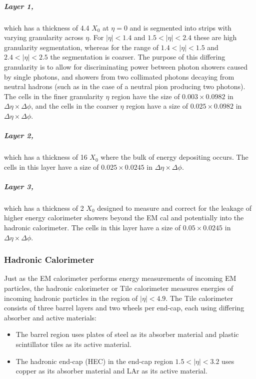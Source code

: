 \documentclass[12pt,a4paper,epsf,portrait,times,epsfig]{report}
\begin{document}
		\subparagraph{Layer 1,} which has a thickness of 4.4 $X_{0}$ at $\eta = 0$ and is segmented into strips with varying granularity across $\eta$. For $|\eta| < 1.4$ and $1.5 < |\eta| < 2.4$ these are high granularity segmentation, whereas for the range of $1.4 < |\eta| < 1.5$ and $2.4 < |\eta| < 2.5$ the segmentation is coarser. The purpose of this differing granularity is to allow for discriminating power between photon showers caused by single photons, and showers from two collimated photons decaying from neutral hadrons (such as in the case of a neutral pion producing two photons). The cells in the finer granularity $\eta$ region have the size of $0.003 \times 0.0982$ in $\Delta\eta \times \Delta\phi$, and the cells in the coarser $\eta$ region have a size of $0.025 \times 0.0982$ in $\Delta\eta \times \Delta\phi$. 
		
		\subparagraph{Layer 2,} which has a thickness of 16 $X_{0}$ where the bulk of energy depositing occurs. The cells in this layer have a size of $0.025 \times 0.0245$ in $\Delta\eta \times \Delta\phi$. 
		
		\subparagraph{Layer 3,} which has a thickness of 2 $X_{0}$ designed to measure and correct for the leakage of higher energy calorimeter showers beyond the EM cal and potentially into the hadronic calorimeter. The cells in this layer have a size of $0.05 \times 0.0245$ in $\Delta\eta \times \Delta\phi$. 
		
		\subsubsection{Hadronic Calorimeter}\label{Section:HCal}

		Just as the EM calorimeter performs energy measurements of incoming EM particles, the hadronic calorimeter or Tile calorimeter \cite{ATLASTileTDR} measures energies of incoming hadronic particles in the region of $|\eta| < 4.9$. The Tile calorimeter consists of three barrel layers and two wheels per end-cap, each using differing absorber and active materials:
		
		\begin{itemize}
			\item The barrel region uses plates of steel as its absorber material and plastic scintillator tiles as its active material.
			\item The hadronic end-cap (HEC) in the end-cap region $1.5 < |\eta| < 3.2$ uses copper as its absorber material and LAr as its active material. 
		\end{itemize}
\end{document}
